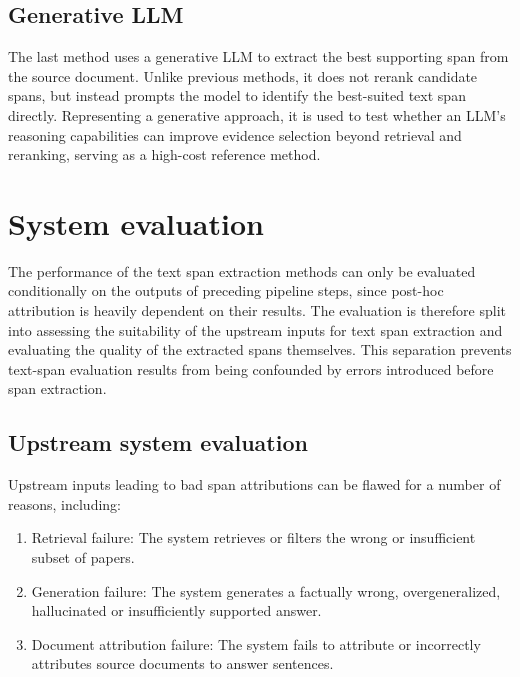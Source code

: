 \subsection{Generative LLM}
The last method uses a generative LLM to extract the best supporting span from the source document. Unlike previous methods, it does not rerank candidate spans, but instead prompts the model to identify the best-suited text span directly. Representing a generative approach, it is used to test whether an LLM's reasoning capabilities can improve evidence selection beyond retrieval and reranking, serving as a high-cost reference method.

\section{System evaluation}
The performance of the text span extraction methods can only be evaluated conditionally on the outputs of preceding pipeline steps, since post-hoc attribution is heavily dependent on their results. The evaluation is therefore split into assessing the suitability of the upstream inputs for text span extraction and evaluating the quality of the extracted spans themselves. This separation prevents text-span evaluation results from being confounded by errors introduced before span extraction.

\subsection{Upstream system evaluation}


Upstream inputs leading to bad span attributions can be flawed for a number of reasons, including:
\begin{enumerate}
    \item Retrieval failure: The system retrieves or filters the wrong or insufficient subset of papers.
    \item Generation failure: The system generates a factually wrong, overgeneralized, hallucinated or insufficiently supported answer.
    \item Document attribution failure: The system fails to attribute or incorrectly attributes source documents to answer sentences.
\end{enumerate}

